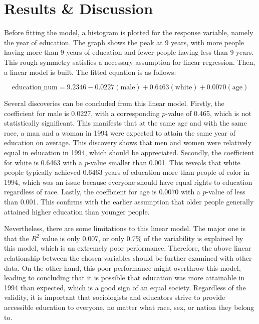 \documentclass[12pt]{report}
\begin{document}
\section*{\large Results \& Discussion}

Before fitting the model, a histogram is plotted for the response variable, namely the year of education. The graph shows the peak at 9 years, with more people having more than 9 years of education and fewer people having less than 9 years. This rough symmetry satisfies a necessary assumption for linear regression. Then, a linear model is built. The fitted equation is as follows:

\vspace{-1.5cm}
$$\text{education\_num} = 9.2346-0.0227(\text{male})+0.6463(\text{white})+0.0070(\text{age})$$
\vspace{-1.5cm}

Several discoveries can be concluded from this linear model. Firstly, the coefficient for male is 0.0227, with a corresponding $p$-value of 0.465, which is not statistically significant. This manifests that at the same age and with the same race, a man and a woman in 1994 were expected to attain the same year of education on average. This discovery shows that men and women were relatively equal in education in 1994, which should be appreciated. Secondly, the coefficient for white is 0.6463 with a $p$-value smaller than 0.001. This reveals that white people typically achieved 0.6463 years of education more than people of color in 1994, which was an issue because everyone should have equal rights to education regardless of race. Lastly, the coefficient for age is 0.0070 with a $p$-value of less than 0.001. This confirms with the earlier assumption that older people generally attained higher education than younger people.

Nevertheless, there are some limitations to this linear model. The major one is that the $R^2$ value is only 0.007, or only $0.7\%$ of the variability is explained by this model, which is an extremely poor performance. Therefore, the above linear relationship between the chosen variables should be further examined with other data. On the other hand, this poor performance might overthrow this model, leading to concluding that it is possible that education was more attainable in 1994 than expected, which is a good sign of an equal society. Regardless of the validity, it is important that sociologists and educators strive to provide accessible education to everyone, no matter what race, sex, or nation they belong to.
\end{document}
